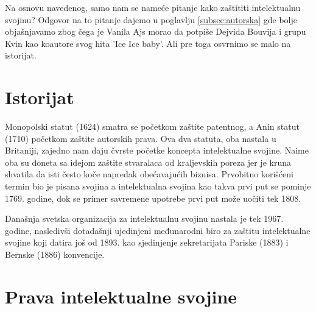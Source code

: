 \documentclass[a4paper]{article}
\begin{document}
Na osnovu navedenog, samo nam se nameće pitanje kako zaštititi intelektualnu svojinu? Odgovor na to pitanje
dajemo u poglavlju \ref{subsec:autorska} gde bolje objašnjavamo zbog čega je Vanila Ajs morao da potpiše Dejvida Bouvija i grupu
Kvin kao koautore svog hita 'Ice Ice baby'. Ali pre toga osvrnimo se malo na istorijat.


\section{Istorijat}
Monopolski statut (1624) smatra se početkom zaštite patentnog, a Anin statut (1710) početkom zaštite autorskih prava. Ova dva statuta, oba nastala u Britaniji, zajedno nam daju čvrste početke koncepta intelektualne svojine. Naime oba su doneta sa idejom zaštite stvaralaca od kraljevskih poreza jer je kruna shvatila da isti često koče napredak obećavajućih biznisa. Prvobitno korišćeni termin bio je pisana svojina a intelektualna svojina kao takva prvi put se pominje 1769. godine, dok se primer savremene upotrebe prvi put može uočiti tek 1808. 

Današnja svetska organizacija za intelektualnu svojinu nastala je tek 1967. godine, nasledivši dotadašnji ujedinjeni međunarodni biro za zaštitu intelektualne svojine koji datira još od 1893. kao sjedinjenje sekretarijata Pariske (1883) i Bernske (1886) konvencije.

\section{Prava intelektualne svojine}	
\label{sec:prava_int_svoj}
\end{document}
